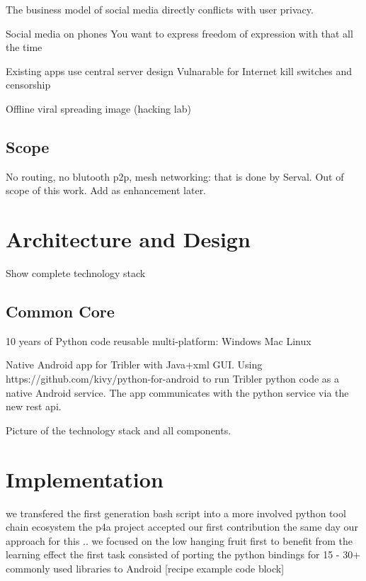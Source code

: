 \documentclass[]{report}
\begin{document}
The business model of social media directly conflicts with user privacy. %

Social media on phones
You want to express freedom of expression with that all the time

Existing apps use central server design
Vulnarable for Internet kill switches and censorship

Offline viral spreading image (hacking lab)





\section{Scope}
No routing, no blutooth p2p, mesh networking: that is done by Serval. Out of scope of this work. Add as enhancement later.










\chapter{Architecture and Design}

Show complete technology stack


\section{Common Core}
10 years of Python code 
reusable multi-platform: Windows Mac Linux


Native Android app for Tribler with Java+xml GUI.
Using https://github.com/kivy/python-for-android to run Tribler python code as a native Android service.
The app communicates with the python service via the new rest api.

Picture of the technology stack and all components.


\chapter{Implementation}


we transfered the first generation bash script into a more involved python tool chain ecosystem
the p4a project accepted our first contribution the same day
our approach for this .. we focused on the low hanging fruit first to benefit from the learning effect
the first task consisted of porting the python bindings for 15 - 30+ commonly used libraries to Android [recipe example code block]
\end{document}
